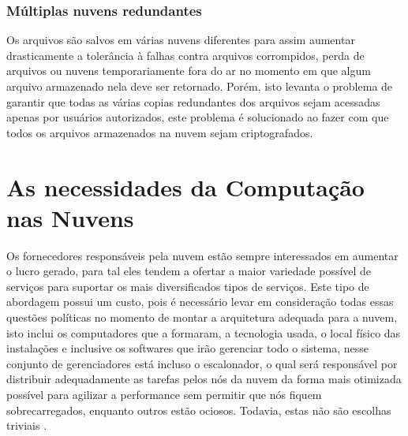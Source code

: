 	\subsubsection{Múltiplas nuvens redundantes}
	Os arquivos são salvos em várias nuvens diferentes para assim aumentar drasticamente a tolerância à falhas contra arquivos corrompidos, perda de arquivos ou nuvens temporariamente fora do ar no momento em que algum arquivo armazenado nela deve ser retornado. Porém, isto levanta o problema de garantir que todas as várias copias redundantes dos arquivos sejam acessadas apenas por usuários autorizados, este problema é solucionado ao fazer com que todos os arquivos armazenados na nuvem sejam criptografados.


\section{As necessidades da Computação nas Nuvens}
Os fornecedores responsáveis pela nuvem estão sempre interessados em aumentar o lucro gerado, para tal eles tendem a ofertar a maior variedade possível de serviços para suportar os mais diversificados tipos de serviços. Este tipo de abordagem possui um custo, pois é necessário levar em consideração todas essas questões políticas no momento de montar a arquitetura adequada para a nuvem, isto inclui os computadores que a formaram, a tecnologia usada, o local físico das instalações e inclusive os softwares que irão gerenciar todo o sistema, nesse conjunto de gerenciadores está incluso o escalonador, o qual será responsável por distribuir adequadamente as tarefas pelos nós da nuvem da forma mais otimizada possível para agilizar a performance sem permitir que nós fiquem sobrecarregados, enquanto outros estão ociosos. Todavia, estas não são escolhas triviais \cite{drasko1}.\\

